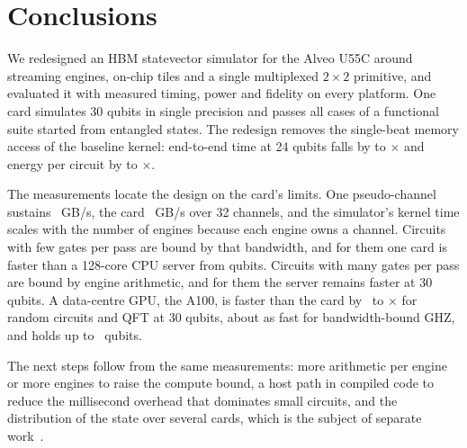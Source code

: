 \section{Conclusions}\label{sec:conclusions}

We redesigned an HBM statevector simulator for the Alveo U55C around streaming engines, on-chip tiles and a single multiplexed $2\times2$ primitive, and evaluated it with measured timing, power and fidelity on every platform. One card simulates 30 qubits in single precision and passes all \NumSuiteTotal{} cases of a functional suite started from entangled states. The redesign removes the single-beat memory access of the baseline kernel: end-to-end time at 24 qubits falls by \NumSpeedupVsevenMin to \NumSpeedupVsevenMax$\times$ and energy per circuit by \NumEnergyVsevenRatioMin to \NumEnergyVsevenRatioMax$\times$.

The measurements locate the design on the card's limits. One pseudo-channel sustains \NumHbmSixteenPerCURead~GB/s, the card \NumHbmThirtytwoCopy~GB/s over 32 channels, and the simulator's kernel time scales with the number of engines because each engine owns a channel. Circuits with few gates per pass are bound by that bandwidth, and for them one card is faster than a 128-core CPU server from \NumXplatGhzCrossN{} qubits. Circuits with many gates per pass are bound by engine arithmetic, and for them the server remains faster at 30 qubits. A data-centre GPU, the A100, is faster than the card by \NumXplatBestGpuRatioRqcThirty~to \NumXplatBestGpuRatioQftThirty$\times$ for random circuits and QFT at 30 qubits, about as fast for bandwidth-bound GHZ, and holds up to \NumGpuCudaqSingleMaxN~qubits.

The next steps follow from the same measurements: more arithmetic per engine or more engines to raise the compute bound, a host path in compiled code to reduce the millisecond overhead that dominates small circuits, and the distribution of the state over several cards, which is the subject of separate work~\cite{ali2026multifpga}.
